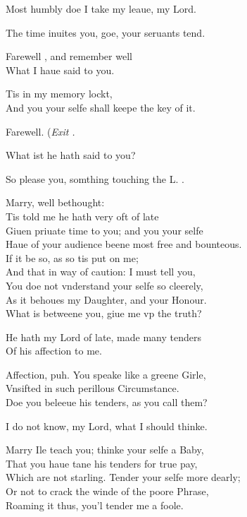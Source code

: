 \documentclass[a5paper,DIV=calc,11pt]{scrbook}
\begin{document}
\begin{drama*}
    \laerspeaks Most humbly doe I take my leaue, my Lord.
    
    \polspeaks The time inuites you, goe, your seruants tend.
    
    \laerspeaks Farewell \ophe, and remember well\\
    What I haue said to you.
    
    \ophespeaks Tis in my memory lockt,\\
    And you your selfe shall keepe the key of it.
    
    \laerspeaks Farewell. \hfill(\textit{Exit \laer.}
    
    \polspeaks What ist \ophe he hath said to you?
    
    \ophespeaks So please you, somthing touching the L. \ham.
    
    \polspeaks Marry, well bethought:\\
    Tis told me he hath very oft of late\\
    Giuen priuate time to you; and you your selfe\\
    Haue of your audience beene most free and bounteous.\\
    If it be so, as so tis put on me;\\
    And that in way of caution: I must tell you,\\
    You doe not vnderstand your selfe so cleerely,\\
    As it behoues my Daughter, and your Honour.\\
    What is betweene you, giue me vp the truth?
    
    \ophespeaks He hath my Lord of late, made many tenders\\
    Of his affection to me.
    
    \polspeaks Affection, puh. You speake like a greene Girle,\\
    Vnsifted in such perillous Circumstance.\\
    Doe you beleeue his tenders, as you call them?
    
    \ophespeaks I do not know, my Lord, what I should thinke.
    
    \polspeaks Marry Ile teach you; thinke your selfe a Baby,\\
    That you haue tane his tenders for true pay,\\
    Which are not starling. Tender your selfe more dearly;\\
    Or not to crack the winde of the poore Phrase,\\
    Roaming it thus, you'l tender me a foole.
    

\end{drama*}
\end{document}
